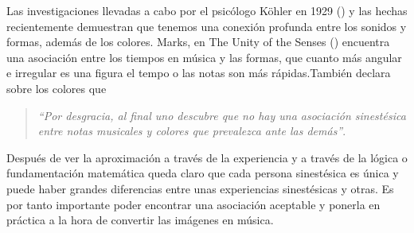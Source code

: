 Las investigaciones llevadas a cabo por el psicólogo Köhler en 1929 (\cite{GestaltPsychology}) y las hechas recientemente demuestran que tenemos una conexión profunda entre los sonidos y formas, además de los colores. Marks, en The Unity of the Senses (\cite{TheUnityOfTheSenses}) encuentra una asociación entre los tiempos en música y las formas, que cuanto más angular e irregular es una figura el tempo o las notas son más rápidas.También declara sobre los colores que 
\begin{quote}
\emph{``Por desgracia, al final uno descubre que no hay una asociación sinestésica entre notas musicales y colores que prevalezca ante las demás''}.\\
\end{quote}

Después de ver la aproximación a través de la experiencia y a través de la lógica o fundamentación matemática queda claro que cada persona sinestésica es única y puede haber grandes diferencias entre unas experiencias sinestésicas y otras. Es por tanto importante poder encontrar una asociación aceptable y ponerla en práctica a la hora de convertir las imágenes en música.
